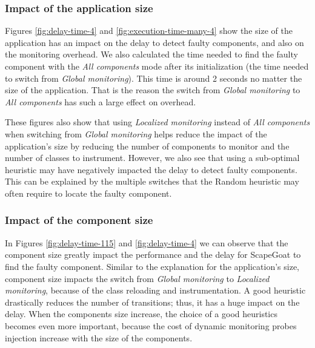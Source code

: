 \subsubsection{Impact of the application size}
Figures \ref{fig:delay-time-4} and \ref{fig:execution-time-many-4} show the size of the application has an impact on the delay to detect faulty components, and also on the monitoring overhead.
We also calculated the time needed to find the faulty component with the \emph{All components} mode after its initialization (the time needed to switch from \emph{Global monitoring}).
This time is around 2 seconds no matter the size of the application.
That is the reason the switch from \emph{Global monitoring} to \emph{All components} has such a large effect on overhead.

These figures also show that using \emph{Localized monitoring} instead of \emph{All components} when switching from \emph{Global monitoring} helps reduce the impact of the application's size by reducing the number of components to monitor and the number of classes to instrument.
However, we also see that using a sub-optimal heuristic may have negatively impacted the delay to detect faulty components.
This can be explained by the multiple switches that the Random heuristic may often require to locate the faulty component.

\subsubsection{Impact of the component size}
In Figures \ref{fig:delay-time-115} and \ref{fig:delay-time-4} we can observe that the component size greatly impact the performance and the delay for ScapeGoat to find the faulty component. 
Similar to the explanation for the application's size, component size impacts the switch from \emph{Global monitoring} to \emph{Localized monitoring}, because of the class reloading and instrumentation.
A good heuristic drastically reduces the number of transitions; thus, it has a huge impact on the delay. 
When the components size increase, the choice of a good heuristics becomes even more important, because the cost of dynamic monitoring probes injection increase with the size of the components.